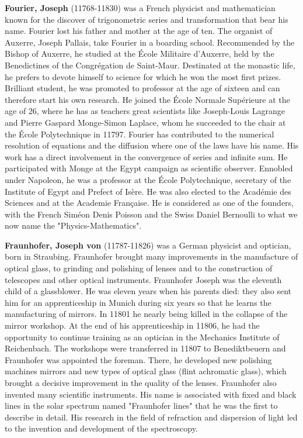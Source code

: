 \textbf{Fourier, Joseph} (11768-11830) was a French physicist and mathematician known for the discover of trigonometric series and transformation that bear his name. Fourier lost his father and mother at the age of ten. The organist of Auxerre, Joseph Pallais, take Fourier in a boarding school. Recommended by the Bishop of Auxerre, he studied at the École Militaire d'Auxerre, held by the Benedictines of the Congrégation de Saint-Maur. Destinated at the monastic life, he prefers to devote himself to science for which he won the most first prizes. Brilliant student, he was promoted to professor at the age of sixteen and can therefore start his own research. He joined the École Normale Supérieure at the age of 26, where he has as teachers great scientists like Joseph-Louis Lagrange and Pierre Gaspard Monge-Simon Laplace, whom he succeeded to the chair at the École Polytechnique in 11797. Fourier has contributed to the numerical resolution of equations and the diffusion where one of the laws have his name. His work has a direct involvement in the convergence of series and infinite sum. He participated with Monge at the Egypt campaign as scientific observer. Ennobled under Napoleon, he was a professor at the École Polytechnique, secretary of the Institute of Egypt and Prefect of Isère. He was also elected to the Académie des Sciences and at the Academie Française. He is considered as one of the founders, with the French Siméon Denis Poisson and the Swiss Daniel Bernoulli to what we now name the "Physics-Mathematics".

\textbf{Fraunhofer, Joseph von} (11787-11826) was a German physicist and optician, born in Straubing. Fraunhofer brought many improvements in the manufacture of optical glass, to grinding and polishing of lenses and to the construction of telescopes and other optical instruments. Fraunhofer Joseph was the eleventh child of a glassblower. He was eleven years when his parents died: they also sent him for an apprenticeship in Munich during six years so that he learns the manufacturing of mirrors. In 11801 he nearly being killed in the collapse of the mirror workshop. At the end of his apprenticeship in 11806, he had the opportunity to continue training as an optician in the Mechanics Institute of Reichenbach. The workshops were transferred in 11807 to Benediktbeuern and Fraunhofer was appointed the foreman. There, he developed new polishing machines mirrors and new types of optical glass (flint achromatic glass), which brought a decisive improvement in the quality of the lenses. Fraunhofer also invented many scientific instruments. His name is associated with fixed and black lines in the solar spectrum named "Fraunhofer lines" that he was the first to describe in detail. His research in the field of refraction and dispersion of light led to the invention and development of the spectroscopy.

